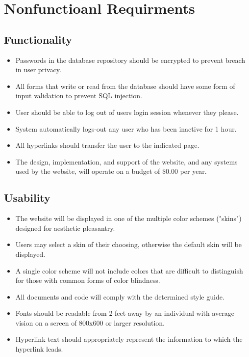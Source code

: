 \section{Nonfunctioanl Requirments}
	\subsection{Functionality}
	\begin{itemize}
		\item Passwords in the database repository should be encrypted to prevent breach in user privacy.
		\item All forms that write or read from the database should have some form of input validation to prevent SQL injection.
		\item User should be able to log out of users login session whenever they please.
		\item System automatically logs-out any user who has been inactive for 1 hour.
		\item All hyperlinks should transfer the user to the indicated page.
		\item The design, implementation, and support of the website, and any systems used by the website, will operate on a budget of \$0.00 per year.
	\end{itemize}
	
	\subsection{Usability}
	\begin{itemize}
		\item The website will be displayed in one of the multiple color schemes ("skins") designed for aesthetic pleasantry.
		\item Users may select a skin of their choosing, otherwise the default skin will be displayed.
		\item A single color scheme will not include colors that are difficult to distinguish for those with common forms of color blindness.
		\item All documents and code will comply with the determined style guide.
		\item Fonts should be readable from 2 feet away by an individual with average vision on a screen of 800x600 or larger resolution.
		\item Hyperlink text should appropriately represent the information to which the hyperlink leads.
	\end{itemize}
	
